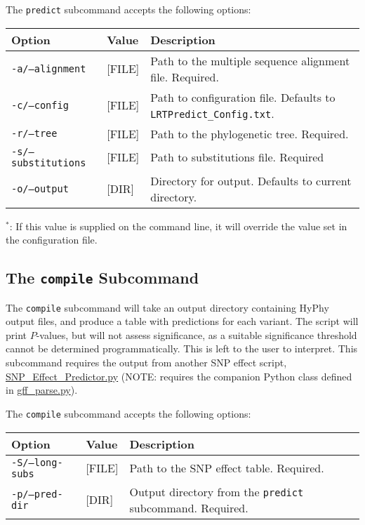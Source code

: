 \documentclass[12pt]{article}
\begin{document}
\par The \texttt{predict} subcommand accepts the following options:
\begin{table}[H]
    \centering
    \begin{tabular}{p{105pt} l p{260pt}}
    \toprule
    Option & Value & Description \\
    \midrule
    \texttt{-a/--alignment} & [FILE] & Path to the multiple sequence alignment file. Required.\\
    \midrule
    \texttt{-c/--config} & [FILE] & Path to configuration file. Defaults to \texttt{LRTPredict\_Config.txt}. \\
    \midrule
    \texttt{-r/--tree} & [FILE] & Path to the phylogenetic tree. Required.\\
    \midrule
    \texttt{-s/--substitutions} & [FILE] & Path to substitutions file. Required\\
    \midrule
	\texttt{-o/--output} & [DIR] & Directory for output. Defaults to current directory.\\
    \bottomrule
    \end{tabular}
\end{table}
\par $^*$: If this value is supplied on the command line, it will override
the value set in the configuration file.

\subsection*{The \texttt{compile} Subcommand}
\par The \texttt{compile} subcommand will take an output directory containing
HyPhy output files, and produce a table with predictions for each variant. The
script will print $P$-values, but will not assess significance, as a suitable
significance threshold cannot be determined programmatically. This is left to
the user to interpret. This subcommand requires the output from another SNP
effect script, \href{https://raw.githubusercontent.com/TomJKono/Misc_Utils/master/SNP_Effect_Predictor.py}
{SNP\_Effect\_Predictor.py} (NOTE: requires the companion Python class defined
in \href{https://raw.githubusercontent.com/TomJKono/Misc_Utils/master/gff_parse.py}{gff\_parse.py}).

\par The \texttt{compile} subcommand accepts the following options:
\begin{table}[H]
    \centering
    \begin{tabular}{p{105pt} l p{260pt}}
    \toprule
    Option & Value & Description \\
    \midrule
    \texttt{-S/--long-subs} & [FILE] & Path to the SNP effect table. Required.\\
    \midrule
    \texttt{-p/--pred-dir} & [DIR] & Output directory from the \texttt{predict} subcommand. Required.\\
    \bottomrule
    \end{tabular}
\end{table}
\end{document}
